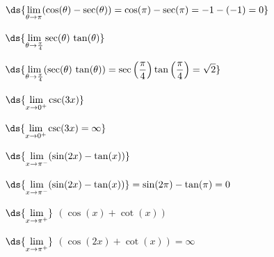\documentclass{ximera}
\begin{document}
\begin{question}
\begin{problem}
    \begin{solution}
         $\ds{\lim_{\theta \rightarrow \pi} (\cos(\theta)  -  \sec(\theta)) = \cos(\pi) - \sec(\pi) = -1 - (-1) = 0}$
    \end{solution}
\end{problem}

\begin{problem}
    $\ds{\lim_{\theta \rightarrow \frac{\pi}{4}} \sec(\theta) \, \tan(\theta)}$

    \begin{solution}
         $\ds{\lim_{\theta \rightarrow \frac{\pi}{4}} (\sec(\theta) \, \tan(\theta)) = \sec\left( \frac{\pi}{4} \right) \tan\left( \frac{\pi}{4} \right) = \sqrt{2}}$
    \end{solution}
\end{problem}

\begin{problem}
    $\ds{\lim_{x \rightarrow 0^{+}} \csc(3x)}$

    \begin{solution}
        $\ds{\lim_{x \rightarrow 0^{+}} \csc(3x) = \infty}$
    \end{solution}
\end{problem}

\begin{problem}
    $\ds{\lim_{x \rightarrow \pi^{-}}  (\sin(2x)  - \tan(x))}$

    \begin{solution}
        $\ds{\lim_{x \rightarrow \pi^{-}}  (\sin(2x)  - \tan(x))}  = \sin(2\pi) - \tan(\pi) = 0$
    \end{solution}
\end{problem}

\begin{problem}\label{othertriglimitexlast} 
    $\ds{\lim_{x \rightarrow \pi^{+}}}$ $(\cos(x) + \cot(x))$

    \begin{solution}
        $\ds{\lim_{x \rightarrow \pi^{+}}}$ $(\cos(2x) + \cot(x)) =  \infty$
    \end{solution}
\end{problem}

\end{question}
\end{document}
